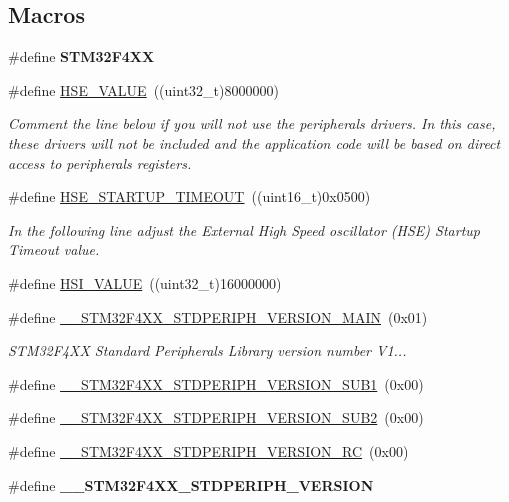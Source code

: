 \subsection*{Macros}
\begin{DoxyCompactItemize}
\item 
\mbox{\label{group___library__configuration__section_ga252742cf70ce5210bc8817d386abced6}} 
\#define {\bfseries S\+T\+M32\+F4\+XX}
\item 
\#define \hyperlink{group___library__configuration__section_gaeafcff4f57440c60e64812dddd13e7cb}{H\+S\+E\+\_\+\+V\+A\+L\+UE}~((uint32\+\_\+t)8000000)
\begin{DoxyCompactList}\small\item\em Comment the line below if you will not use the peripherals drivers. In this case, these drivers will not be included and the application code will be based on direct access to peripherals registers. \end{DoxyCompactList}\item 
\#define \hyperlink{group___library__configuration__section_ga68ecbc9b0a1a40a1ec9d18d5e9747c4f}{H\+S\+E\+\_\+\+S\+T\+A\+R\+T\+U\+P\+\_\+\+T\+I\+M\+E\+O\+UT}~((uint16\+\_\+t)0x0500)
\begin{DoxyCompactList}\small\item\em In the following line adjust the External High Speed oscillator (H\+SE) Startup Timeout value. \end{DoxyCompactList}\item 
\#define \hyperlink{group___library__configuration__section_gaaa8c76e274d0f6dd2cefb5d0b17fbc37}{H\+S\+I\+\_\+\+V\+A\+L\+UE}~((uint32\+\_\+t)16000000)
\item 
\#define \hyperlink{group___library__configuration__section_gab16ffe03509714c63d5e530131c494f4}{\+\_\+\+\_\+\+S\+T\+M32\+F4\+X\+X\+\_\+\+S\+T\+D\+P\+E\+R\+I\+P\+H\+\_\+\+V\+E\+R\+S\+I\+O\+N\+\_\+\+M\+A\+IN}~(0x01)
\begin{DoxyCompactList}\small\item\em S\+T\+M32\+F4\+XX Standard Peripherals Library version number V1... \end{DoxyCompactList}\item 
\#define \hyperlink{group___library__configuration__section_gadce716e810a51b042298fb21b63e5366}{\+\_\+\+\_\+\+S\+T\+M32\+F4\+X\+X\+\_\+\+S\+T\+D\+P\+E\+R\+I\+P\+H\+\_\+\+V\+E\+R\+S\+I\+O\+N\+\_\+\+S\+U\+B1}~(0x00)
\item 
\#define \hyperlink{group___library__configuration__section_ga4b16607e43a35289dc5ebb608b1261d4}{\+\_\+\+\_\+\+S\+T\+M32\+F4\+X\+X\+\_\+\+S\+T\+D\+P\+E\+R\+I\+P\+H\+\_\+\+V\+E\+R\+S\+I\+O\+N\+\_\+\+S\+U\+B2}~(0x00)
\item 
\#define \hyperlink{group___library__configuration__section_gad5bec5e54ac96b9238a6363f2088f85c}{\+\_\+\+\_\+\+S\+T\+M32\+F4\+X\+X\+\_\+\+S\+T\+D\+P\+E\+R\+I\+P\+H\+\_\+\+V\+E\+R\+S\+I\+O\+N\+\_\+\+RC}~(0x00)
\item 
\#define {\bfseries \+\_\+\+\_\+\+S\+T\+M32\+F4\+X\+X\+\_\+\+S\+T\+D\+P\+E\+R\+I\+P\+H\+\_\+\+V\+E\+R\+S\+I\+ON}
\end{DoxyCompactItemize}


